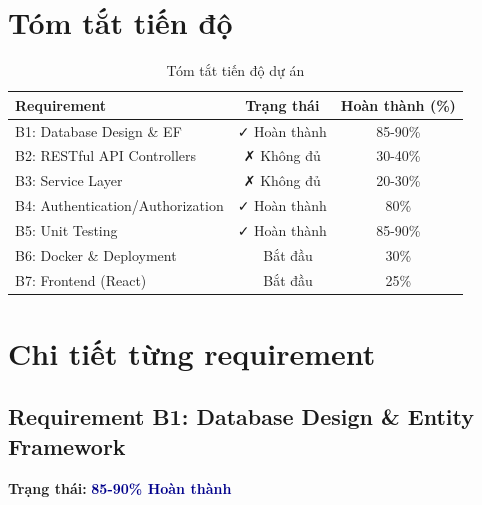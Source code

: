 \documentclass[12pt,a4paper]{report}
\begin{document}
\section{Tóm tắt tiến độ}
\begin{table}[h]
    \centering
    \begin{tabular}{|l|c|c|}
        \hline
        \rowcolor{lightblue}
        \textbf{Requirement} & \textbf{Trạng thái} & \textbf{Hoàn thành (\%)} \\
        \hline
        B1: Database Design \& EF & \cellcolor{lightgreen}✓ Hoàn thành & 85-90\% \\
        B2: RESTful API Controllers & \cellcolor{lightred}✗ Không đủ & 30-40\% \\
        B3: Service Layer & \cellcolor{lightred}✗ Không đủ & 20-30\% \\
        B4: Authentication/Authorization & \cellcolor{lightgreen}✓ Hoàn thành & 80\% \\
        B5: Unit Testing & \cellcolor{lightgreen}✓ Hoàn thành & 85-90\% \\
        B6: Docker \& Deployment & \cellcolor{lightblue}~ Bắt đầu & 30\% \\
        B7: Frontend (React) & \cellcolor{lightblue}~ Bắt đầu & 25\% \\
        \hline
    \end{tabular}
    \caption{Tóm tắt tiến độ dự án}
\end{table}

\section{Chi tiết từng requirement}

\subsection{Requirement B1: Database Design \& Entity Framework}
\textbf{Trạng thái: } \textcolor{darkblue}{\textbf{85-90\% Hoàn thành}}
\end{document}
